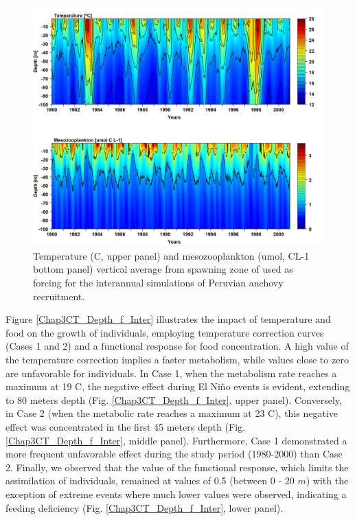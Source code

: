 \begin{figure}[H]
	\includegraphics[width=1.0\textwidth]{figures/Chap3TempMesoInter.png}
	\centering
	\caption{Temperature (\textdegree C, upper panel) and mesozooplankton (umol, CL-1 bottom panel) vertical average from spawning zone of used as forcing for the interannual simulations of Peruvian anchovy recruitment.}
	\label{Chap3TempMesoInter}
\end{figure}

Figure \ref{Chap3CT_Depth_f_Inter} illustrates the impact of temperature and food on the growth of individuals, employing temperature correction curves (Cases 1 and 2) and a functional response for food concentration. A high value of the temperature correction implies a faster metabolism, while values close to zero are unfavorable for individuals. In Case 1, when the metabolism rate reaches a maximum at 19 \textdegree C, the negative effect during El Niño events is evident, extending to 80 meters depth (Fig. \ref{Chap3CT_Depth_f_Inter}, upper panel). Conversely, in Case 2 (when the metabolic rate reaches a maximum at 23 \textdegree C), this negative effect was concentrated in the first 45 meters depth (Fig. \ref{Chap3CT_Depth_f_Inter}, middle panel). Furthermore, Case 1 demonstrated a more frequent unfavorable effect during the study period (1980-2000) than Case 2. Finally, we observed that the value of the functional response, which limits the assimilation of individuals, remained at values of 0.5 (between 0 - 20 $m$) with the exception of extreme events where much lower values were observed, indicating a feeding deficiency (Fig. \ref{Chap3CT_Depth_f_Inter}, lower panel).\\

